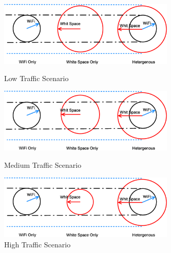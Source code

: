 \begin{figure}
\centering
\includegraphics[width=84mm]{figures/lowtraffic}
\vspace{-0.1in}
\caption{Low Traffic Scenario}                                                                 
\label{fig:lowtraffic}

\includegraphics[width=84mm]{figures/mediumtraffic}
\vspace{-0.1in}
\caption{Medium Traffic Scenario}                                                                 
\label{fig:mediumtraffic}


\includegraphics[width=84mm]{figures/hightraffic}
\vspace{-0.1in}
\caption{High Traffic Scenario}                                                                 
\label{fig:hightraffic}
\vspace{-0.1in}
\end{figure}

